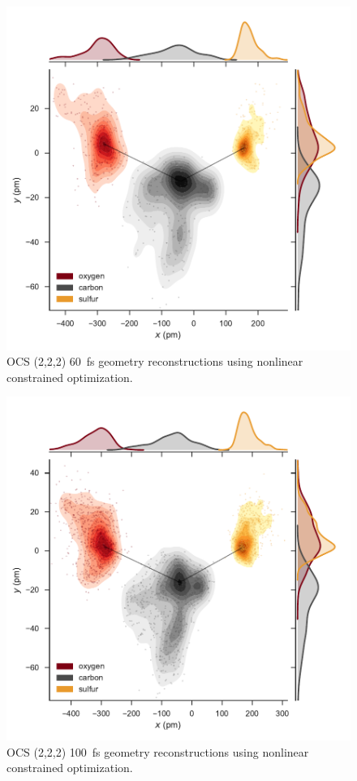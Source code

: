 \begin{figure}
  \centering
  \includegraphics[width=\textwidth]{Plots/OCS22260fsMOGeometry}
  \caption[OCS (2,2,2) \SI{60}{\fs} geometry reconstructions using nonlinear constrained optimization.]
  {OCS (2,2,2) \SI{60}{\fs} geometry reconstructions using nonlinear constrained optimization.}
  \label{fig:OCS22260fsMOGeometry}
\end{figure}

\begin{figure}
  \centering
  \includegraphics[width=\textwidth]{Plots/OCS222100fsMOGeometry}
  \caption[OCS (2,2,2) \SI{100}{\fs} geometry reconstructions using nonlinear constrained optimization.]
  {OCS (2,2,2) \SI{100}{\fs} geometry reconstructions using nonlinear constrained optimization.}
  \label{fig:OCS222100fsMOGeometry}
\end{figure}